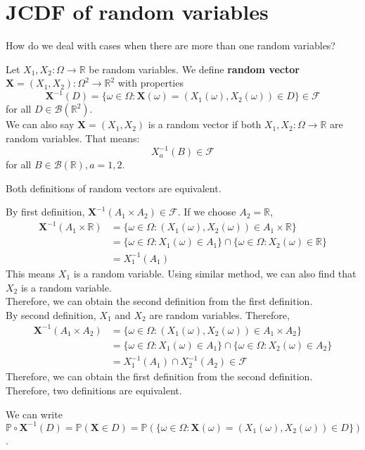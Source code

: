 \documentclass{huhtakm-template-book}
\newcommand{\prob}{\mathbb{P}}
\begin{document}
\section{JCDF of random variables}
How do we deal with cases when there are more than one random variables?
\begin{defn}
	Let $X_{1},X_{2}:\Omega\to\mathbb{R}$ be random variables. We define \textbf{random vector} $\mathbf{X}=(X_{1},X_{2}):\Omega^{2}\to\mathbb{R}^{2}$ with properties
	\begin{equation*}
		\mathbf{X}^{-1}(D)=\{\omega\in\Omega:\mathbf{X}(\omega)=(X_{1}(\omega),X_{2}(\omega))\in D\}\in\mathcal{F}
	\end{equation*}
	for all $D\in\mathcal{B}(\mathbb{R}^{2})$.\\
	We can also say $\mathbf{X}=(X_{1},X_{2})$ is a random vector if both $X_{1},X_{2}:\Omega\to\mathbb{R}$ are random variables. That means:
	\begin{equation*}
		X_{a}^{-1}(B)\in\mathcal{F}
	\end{equation*}
	for all $B\in\mathcal{B}(\mathbb{R}),a=1,2$.
\end{defn}
\begin{cla}
	Both definitions of random vectors are equivalent.
\end{cla}
\begin{proofing}
	By first definition, $\mathbf{X}^{-1}(A_{1}\times A_{2})\in\mathcal{F}$. If we choose $A_{2}=\mathbb{R}$,
	\begin{align*}
		\mathbf{X}^{-1}(A_{1}\times \mathbb{R})&=\{\omega\in\Omega:(X_{1}(\omega),X_{2}(\omega))\in A_{1}\times\mathbb{R}\}\\
		&=\{\omega\in\Omega:X_{1}(\omega)\in A_{1}\}\cap\{\omega\in\Omega:X_{2}(\omega)\in\mathbb{R}\}\\
		&=X_{1}^{-1}(A_{1})
	\end{align*}
	This means $X_{1}$ is a random variable. Using similar method, we can also find that $X_{2}$ is a random variable.\\
	Therefore, we can obtain the second definition from the first definition.\\
	By second definition, $X_{1}$ and $X_{2}$ are random variables. Therefore,
	\begin{align*}
		\mathbf{X}^{-1}(A_{1}\times A_{2})&=\{\omega\in\Omega:(X_{1}(\omega),X_{2}(\omega))\in A_{1}\times A_{2}\}\\
		&=\{\omega\in\Omega:X_{1}(\omega)\in A_{1}\}\cap\{\omega\in\Omega:X_{2}(\omega)\in A_{2}\}\\
		&=X_{1}^{-1}(A_{1})\cap X_{2}^{-1}(A_{2})\in\mathcal{F}
	\end{align*}
	Therefore, we can obtain the first definition from the second definition.\\
	Therefore, two definitions are equivalent.
\end{proofing}
\begin{rem}
	We can write $\prob\circ\mathbf{X}^{-1}(D)=\prob(\mathbf{X}\in D)=\prob(\{\omega\in\Omega:\mathbf{X}(\omega)=(X_{1}(\omega),X_{2}(\omega))\in D\})$.
\end{rem}
\end{document}
